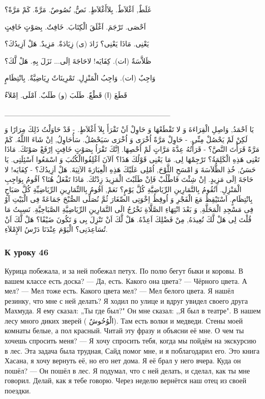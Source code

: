 \documentclass[a5paper]{article}
\begin{document}
غَلَطٌ, اَغْلاَطٌ. بِلاَأَغْلاَطٍ. نَصٌّ, نُصُوصٌ. مَرَّةً. كَمْ مَرَّةً؟ 

اَحْصَى. تَرْجَمَ. اَغْلَقَ الْكِتَابَ. خَافِتٌ. بِصَوْتٍ خَافِتٍ

يَعْنِى. مَاذَا يَعْنِى؟ زَادَ (ى) زِيَادَةٌ. مَزِيدٌ. هَلْ اَزِيدُكَ؟

ظَلاَّسَةٌ (ات). كِفَايَه! لاحَاجَةَ اِلَى... نَزَلَ بِهِ. هَلْ لَّكَ؟

وَاجِبٌ (ات). وَاجِبُ الْمَنْزِلِ. تَمْرِينَاتٌ رِيَاضِيَّةٌ. بِانْتِظَامٍ

قَطَعَ (ا) قَطْعٌ. طَلَبَ (و) طَلَبٌ. اَمْلَى. اِمْلاَءٌ

\_\_\_\_\_\_\_\_\_\_\_\_\_\_\_\_\_\_\_\_\_\_\_\_\_\_\_\_\_\_\_

يَا اَحْمَدُ, وَاصِلِ الْقِرَاءَةَ وَ لا تَقْطَعْهَا وَ حَاوِلْ اَنْ تَقْرَأَ بِلاَ أَغْلاَطٍ. - قَدْ حَاوَلْتُ ذَلِكَ مِرَارًا وَ لَكِنْ لَمْ يَحْصُلْ مِنِّى. - حَاوِلْ مَرَّةً اُخْرَى وَ اُخْرَى سَيَحْصُلُ. سَأُحَاوِلُ, اِنْ شَاءَ االلَّهُ. كَمْ مَرَّةً قَرَأْتَ النَّصَّ؟ - قَرَأْتُهُ عِدَّةَ مَرَّاتٍ لَمْ اُحْصِهَا. اِنَّكَ تَقْرَاُ بِصَوْتٍ خَافِتٍ اِرْفَعْ صَوْتَكَ. مَاذَا تَعْنِى هَذِهِ الْكَلِمَةُ؟ تَرْجِمْهَا لِى. مَا يَعْنِى قَوْلُكَ هَذَا؟ اَلآنَ اَغْلِقُواالْكُتُبَ وَ اسْمَعُوا اَسْئِلَتِى. يَا حَسَنُ, خُذِ الظُّلاَسَةَ وَ امْسَحِ اللَّوْحَ, اُمْلِى عَلَيْكَ هَذِهِ الْعِبَارَةَ الآتِيَةَ. هَلْ اَزِيدُكَ؟ - كِفَايَه! لا حَاجَةَ اِلَى مَزِيدٍ. اِنْ شِئْتَ فَاطْلُبْ فَاِنْ طَلَبْتَ الْمَزِيدَ زِدْتُكَ. مَاذَا تَفْعَلُ هُنَا؟ اَقُومُ بِوَاجِبِ الْمَنْزِلِ. اَتُقُومُ بِالتَّمَارِينِ الرِّيَاضِيََّةِ كُلَّ يَوْمٍ؟ نَعَمْ, اَقُومُ بِاالتِّمَارِينِ الرِّيَاضِيِّةِ كُلَّ صَبَاحٍ بِانْتِظَامٍ. اَسْتَيْقِظُ مَعَ الْفَجْرِ وَ اُوقِظُ اِخْوَتِى الصِّغَارَ ثُمَّ نُصَلِّى الصُّبْحَ جَمَاعَةً فِى الْبَيْتِ اَوْ فِى مَسْجِدِ الْمَحَلَّةِ, وَ بَعْدَ انْتِهَاءِ الصَّلَّاةِ نَخْرُجُ الَى التَّمَارِينِ الرِّيَاضِيَّةِ الصَّبَاحِيَّةِ. نَسِيتُ مَا قُلْتَ لِى هَلْ لَّكَ تُعِيدَهُ, مِنْ فَضْلِكَ اَعِدْهُ. هَلْ لَّكَ اَنْ تَنْزِلَ بِى وَ تَكُونَ ضَيْفًا؟ هَلْ لَّكَ اَنْ تُسَاعِدَنِى؟ الْيَوْمَ عِنْدَنَا دَرْسُ الإِمْلاَءِ. 

\subsubsection{К уроку 46}
Курица побежала, и за ней побежал петух. По полю бегут быки и коровы. В вашем классе есть доска? — Да, есть. Какого она цвета? — Чёрного цвета. А мел? — Мел тоже есть. Какого цвета мел? — Мел белого цвета. Я нашёл резинку, что мне с ней делать? Я ходил по улице и вдруг увидел своего друга Махмуда. Я ему сказал: „Ты где был?" Он мне сказал: ,,Я был в театре". В нашем лесу много диких зверей ( الْوُحُوشٌ). Там есть волки и медведи. Стены моей комнаты белые, а пол красный. Читай эту фразу и объясни её мне. О чем ты хочешь спросить меня? — Я хочу спросить тебя, когда мы пойдём на экскурсию в лес. Эта задача была трудная, Сайд помог мне, и я поблагодарил его. Это книга Хасана, я хочу вернуть её, но его нет дома. Я её брал у него вчера. Куда он пошёл? — Он пошёл в лес. Я подумал, что с ней делать, и сделал, как ты мне говорил. Делай, как я тебе говорю. Через неделю вернётся наш отец из своей поездки.
\end{document}
